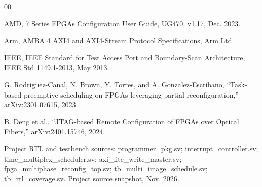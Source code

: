 \documentclass[conference]{IEEEtran}
\begin{document}
\balance

\begin{thebibliography}{00}

AMD, 7 Series FPGAs Configuration User Guide, UG470, v1.17, Dec. 2023.

Arm, AMBA 4 AXI4 and AXI4-Stream Protocol Specifications, Arm Ltd.

IEEE, IEEE Standard for Test Access Port and Boundary-Scan Architecture, IEEE Std 1149.1-2013, May 2013.

G. Rodriguez-Canal, N. Brown, Y. Torres, and A. Gonzalez-Escribano, “Task-based preemptive scheduling on FPGAs leveraging partial reconfiguration,” arXiv:2301.07615, 2023.

B. Deng et al., “JTAG-based Remote Configuration of FPGAs over Optical Fibers,” arXiv:2401.15746, 2024.

Project RTL and testbench sources: programmer\_pkg.sv; interrupt\_controller.sv; time\_multiplex\_scheduler.sv; axi\_lite\_write\_master.sv; fpga\_multiphase\_reconfig\_top.sv; tb\_multi\_image\_schedule.sv; tb\_rtl\_coverage.sv. Project source snapshot, Nov. 2026.

\end{thebibliography}
\end{document}
